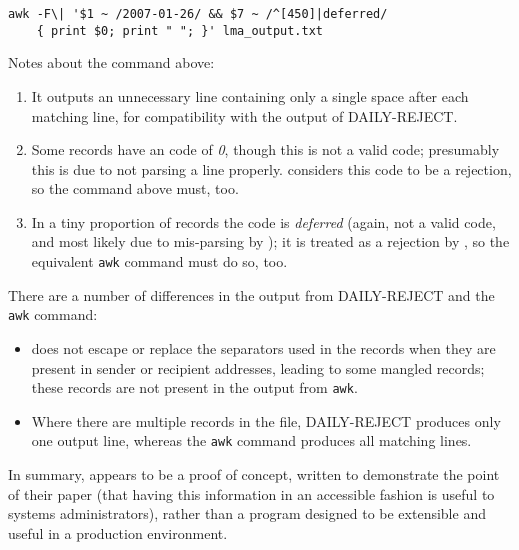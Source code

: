 \documentclass[a4paper,12pt,draft]{article}
\begin{document}
\begin{verbatim}
awk -F\| '$1 ~ /2007-01-26/ && $7 ~ /^[450]|deferred/
    { print $0; print " "; }' lma_output.txt
\end{verbatim}

Notes about the command above:

\begin{enumerate}

    \item It outputs an unnecessary line containing only a single space
        after each matching line, for compatibility with the output of
        DAILY-REJECT\@.

    \item Some records have an \SMTP{} code of \textit{0}, though this is not a
        valid \SMTP{} code; presumably this is due to \LMA{} not parsing a
        line properly.  \LMA{} considers this code to be a rejection, so
        the command above must, too.
        
    \item In a tiny proportion of records the \SMTP{} code is
        \textit{deferred\/} (again, not a valid code, and most likely due
        to mis-parsing by \LMA{}); it is treated as a rejection by \LMA{},
        so the equivalent \texttt{awk} command must do so, too.

\end{enumerate}

There are a number of differences in the output from DAILY-REJECT and the
\texttt{awk} command:

\begin{itemize}

    \item \LMA{} does not escape or replace the separators used in the
        \CSV{} records when they are present in sender or recipient
        addresses, leading to some mangled records; these records are not
        present in the output from \texttt{awk}.

    \item Where there are multiple records in the \CSV{} file, DAILY-REJECT
        produces only one output line, whereas the \texttt{awk} command
        produces all matching lines.

\end{itemize}

In summary, \LMA{} appears to be a proof of concept, written to demonstrate
the point of their paper (that having this information in an accessible
fashion is useful to systems administrators), rather than a program
designed to be extensible and useful in a production environment.
\end{document}
